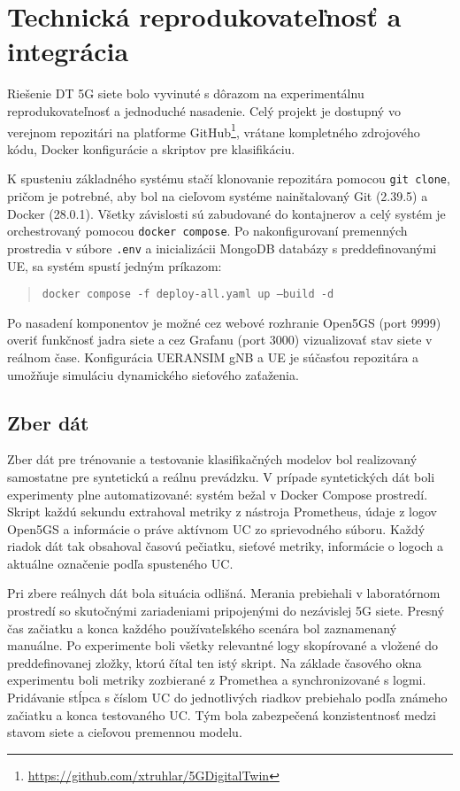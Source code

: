 \section{Technická reprodukovateľnosť a integrácia}

Riešenie DT 5G siete bolo vyvinuté s dôrazom na experimentálnu reprodukovateľnosť a jednoduché nasadenie. Celý projekt je dostupný vo verejnom repozitári na platforme GitHub\footnote{\url{https://github.com/xtruhlar/5GDigitalTwin}}, vrátane kompletného zdrojového kódu, Docker konfigurácie a skriptov pre klasifikáciu.

K spusteniu základného systému stačí klonovanie repozitára pomocou \texttt{git clone}, pričom je potrebné, aby bol na cieľovom systéme nainštalovaný  Git (2.39.5) a  Docker (28.0.1). Všetky závislosti sú zabudované do kontajnerov a celý systém je orchestrovaný pomocou \texttt{docker compose}. Po nakonfigurovaní premenných prostredia v súbore \texttt{.env} a inicializácii MongoDB databázy s preddefinovanými UE, sa systém spustí jedným príkazom:

\begin{quote} \texttt{docker compose -f deploy-all.yaml up --build -d} \end{quote}

Po nasadení komponentov je možné cez webové rozhranie Open5GS (port 9999) overiť funkčnosť jadra siete a cez Grafanu (port 3000) vizualizovať stav siete v reálnom čase. Konfigurácia UERANSIM gNB a UE je súčasťou repozitára a umožňuje simuláciu dynamického sieťového zaťaženia.

\subsection*{Zber dát}

Zber dát pre trénovanie a testovanie klasifikačných modelov bol realizovaný samostatne pre syntetickú a reálnu prevádzku. V prípade syntetických dát boli experimenty plne automatizované: systém bežal v Docker Compose prostredí. Skript každú sekundu extrahoval metriky z nástroja Prometheus, údaje z logov Open5GS a informácie o práve aktívnom UC zo sprievodného súboru. Každý riadok dát tak obsahoval časovú pečiatku, sieťové metriky, informácie o logoch a aktuálne označenie podľa spusteného UC.

Pri zbere reálnych dát bola situácia odlišná. Merania prebiehali v laboratórnom prostredí so skutočnými zariadeniami pripojenými do nezávislej 5G siete. Presný čas začiatku a konca každého používateľského scenára bol zaznamenaný manuálne. Po experimente boli všetky relevantné logy skopírované a vložené do preddefinovanej zložky, ktorú čítal ten istý skript. Na základe časového okna experimentu boli metriky zozbierané z Promethea a synchronizované s logmi. Pridávanie stĺpca s číslom UC do jednotlivých riadkov prebiehalo podľa známeho začiatku a konca testovaného UC. Tým bola zabezpečená konzistentnosť medzi stavom siete a cieľovou premennou modelu.

